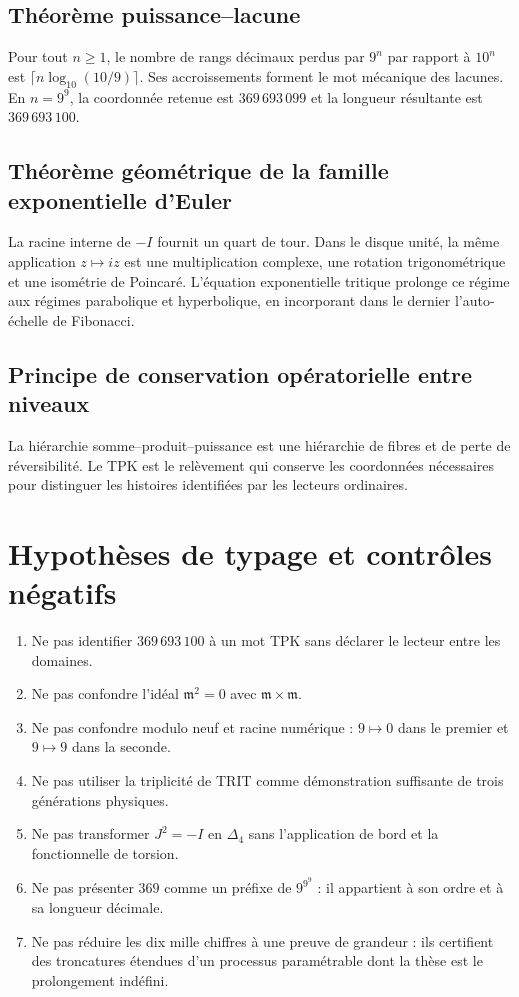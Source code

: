 \subsection{Théorème puissance--lacune}

Pour tout \(n\ge1\), le nombre de rangs décimaux perdus par \(9^n\) par rapport à \(10^n\) est \(\lceil n\log_{10}(10/9)\rceil\). Ses accroissements forment le mot mécanique des lacunes. En \(n=9^9\), la coordonnée retenue est \(369\,693\,099\) et la longueur résultante est \(369\,693\,100\).

\subsection{Théorème géométrique de la famille exponentielle d’Euler}

La racine interne de \(-I\) fournit un quart de tour. Dans le disque unité, la même application \(z\mapsto iz\) est une multiplication complexe, une rotation trigonométrique et une isométrie de Poincaré. L’équation exponentielle tritique prolonge ce régime aux régimes parabolique et hyperbolique, en incorporant dans le dernier l’auto-échelle de Fibonacci.

\subsection{Principe de conservation opératorielle entre niveaux}

La hiérarchie somme–produit–puissance est une hiérarchie de fibres et de perte de réversibilité. Le TPK est le relèvement qui conserve les coordonnées nécessaires pour distinguer les histoires identifiées par les lecteurs ordinaires.


\section{Hypothèses de typage et contrôles négatifs}

\begin{enumerate}
\item Ne pas identifier \(369\,693\,100\) à un mot TPK sans déclarer le lecteur entre les domaines.
\item Ne pas confondre l’idéal \(\mathfrak m^2=0\) avec \(\mathfrak m\times\mathfrak m\).
\item Ne pas confondre modulo neuf et racine numérique : \(9\mapsto0\) dans le premier et \(9\mapsto9\) dans la seconde.
\item Ne pas utiliser la triplicité de TRIT comme démonstration suffisante de trois générations physiques.
\item Ne pas transformer \(J^2=-I\) en \(\Delta_4\) sans l’application de bord et la fonctionnelle de torsion.
\item Ne pas présenter \(369\) comme un préfixe de \(9^{9^9}\) : il appartient à son ordre et à sa longueur décimale.
\item Ne pas réduire les dix mille chiffres à une preuve de grandeur : ils certifient des troncatures étendues d’un processus paramétrable dont la thèse est le prolongement indéfini.
\end{enumerate}

